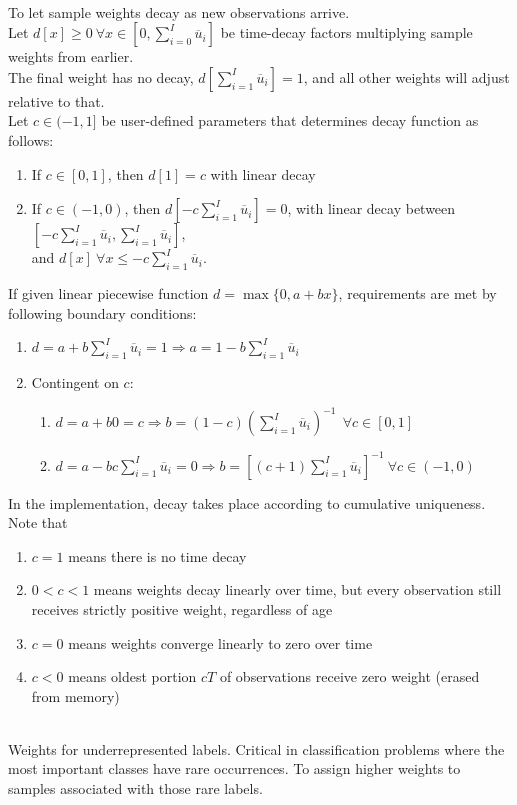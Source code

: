 \documentclass[a4paper,oneside,openany]{book}
\begin{document}
\begin{method}  \\
To let sample weights decay as new observations arrive.\\
Let $d[x] \geq 0 \ \forall x \in [0, \sum_{i=0}^I \overline{u}_i]$ be time-decay factors multiplying sample weights from earlier.\\
The final weight has no decay, $d[\sum_{i=1}^I \overline{u}_i] = 1$, and all other weights will adjust relative to that.\\
Let $c \in (-1, 1]$ be user-defined parameters that determines decay function as follows:
\begin{enumerate}[label=\roman*.]
\setlength{\itemsep}{0pt}
\item If $c \in [0,1]$, then $d[1] = c$ with linear decay
\item If $c \in (-1, 0)$, then $d[-c \sum_{i=1}^I \overline{u}_i] = 0$, with linear decay between $[-c \sum_{i=1}^I \overline{u}_i, \sum_{i=1}^I \overline{u}_i]$,\\
and $d[x] \ \forall x \leq -c \sum_{i=1}^I \overline{u}_i$.
\end{enumerate}
If given linear piecewise function $d = \max \{0, a + bx\}$, requirements are met by following boundary conditions:
\begin{enumerate}[label=\roman*.]
\setlength{\itemsep}{0pt}
\item $d = a + b \sum_{i=1}^I \overline{u}_i = 1 \Rightarrow a = 1 - b \sum_{i=1}^I \overline{u}_i$
\item Contingent on $c$:
\begin{enumerate}[label=\arabic*.]
\setlength{\itemsep}{0pt}
\item $d = a + b0 = c \Rightarrow b = (1-c) (\sum_{i=1}^I \overline{u}_i)^{-1} \ \ \forall c \in [0,1]$
\item $d = a - bc \sum_{i=1}^I \overline{u}_i = 0 \Rightarrow b = [(c+1) \sum_{i=1}^I \overline{u}_i]^{-1} \ \forall c \in (-1, 0)$
\end{enumerate}
\end{enumerate}
In the implementation, decay takes place according to cumulative uniqueness. Note that
\begin{enumerate}[label=\roman*.]
\setlength{\itemsep}{0pt}
\item $c=1$ means there is no time decay
\item $0 < c < 1$ means weights decay linearly over time, but every observation still receives strictly positive weight, regardless of age
\item $c = 0$ means weights converge linearly to zero over time
\item $c < 0$ means oldest portion $cT$ of observations receive zero weight (erased from memory)
\end{enumerate}
\end{method}

\begin{method} \\
Weights for underrepresented labels. Critical in classification problems where the most important classes have rare occurrences. To assign higher weights to samples associated with those rare labels.
\end{method}
\end{document}
